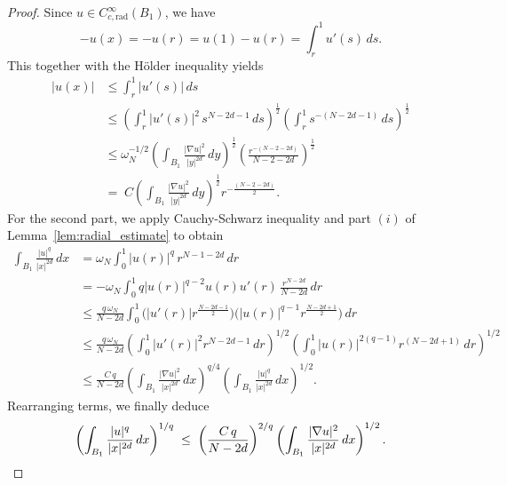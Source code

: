 \documentclass[11pt]{article}
\begin{document}
\begin{proof}
Since $u \in C_{c,\mathrm{rad}}^{\infty}(B_1)$, we have
\begin{equation*}
-u(x) = - u(r) = u(1) - u(r) = \int_{r}^{1} u'(s) \, ds .
\end{equation*}
This together with the H\"{o}lder inequality yields
\begin{equation*}
\begin{aligned}
|u(x)| 
&\leq \int_{r}^{1} |u'(s)| \, ds \\
&\leq \left( \int_{r}^{1} |u'(s)|^2 \, s^{N-2d-1} \, ds \right)^{\tfrac{1}{2}}
\left( \int_{r}^{1} s^{-(N-2d-1)} \, ds \right)^{\tfrac{1}{2}} \\
& \leq \omega_N^{-1/2} 
\left( \int_{B_1} \frac{|\nabla u|^2}{|y|^{2d}} \, dy \right)^{\tfrac{1}{2}}
\left( \frac{r^{-(N-2-2d)}}{N-2-2d} \right)^{\tfrac{1}{2}}\\
& =\; C 
\left( \int_{B_1} \frac{|\nabla u|^2}{|y|^{2d}} \, dy \right)^{\tfrac{1}{2}} 
r^{-\tfrac{(N-2-2d)}{2}} .
\end{aligned}
\end{equation*}
For the second part, we apply Cauchy-Schwarz inequality and part $(i)$ of Lemma~\ref{lem:radial_estimate} to obtain
\begin{equation*}
\begin{aligned}
\int_{B_1} \frac{|u|^q}{|x|^{2d}} \, dx 
&= \omega_N \int_{0}^{1} |u(r)|^q \, r^{N-1-2d} \, dr \\
&= -\omega_N \int_{0}^{1} q |u(r)|^{q-2} u(r) u'(r) \, \frac{r^{N-2d}}{N-2d} \, dr \\
&\leq \frac{q \, \omega_N}{N-2d} 
\int_{0}^{1} \big( |u'(r)| r^{\tfrac{N-2d-1}{2}} \big)
\big( |u(r)|^{q-1} r^{\tfrac{N-2d+1}{2}} \big) \, dr \\
& \leq \frac{q \, \omega_N}{N-2d} 
\left( \int_{0}^{1} |u'(r)|^2 r^{N-2d-1} \, dr \right)^{1/2}
\left( \int_{0}^{1} |u(r)|^{2(q-1)} r^{(N-2d+1)} \, dr \right)^{1/2}\\
& \leq \frac{C \, q }{N-2d} 
\left( \int_{B_1} \frac{|\nabla u|^2}{|x|^{2d}} \, dx \right)^{q/4}
\left( \int_{B_1} \frac{|u|^q}{|x|^{2d}} \, dx \right)^{1/2}.
\end{aligned}
\end{equation*}
Rearranging terms, we finally deduce
\begin{equation*}
\left( \int_{B_1} \frac{|u|^q}{|x|^{2d}} \, dx \right)^{1/q}
\;\leq\; \left( \frac{C \, q}{N-2d} \right)^{2/q}
\left( \int_{B_1} \frac{|\nabla u|^2}{|x|^{2d}} \, dx \right)^{1/2}. \qedhere
\end{equation*}

\end{proof}
\end{document}
